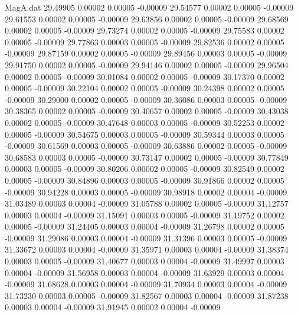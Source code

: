 \begin{filecontents}{MagA.dat}
  29.49905    0.00002    0.00005   -0.00009
  29.54577    0.00002    0.00005   -0.00009
  29.61553    0.00002    0.00005   -0.00009
  29.63856    0.00002    0.00005   -0.00009
  29.68569    0.00002    0.00005   -0.00009
  29.73274    0.00002    0.00005   -0.00009
  29.75583    0.00002    0.00005   -0.00009
  29.77863    0.00003    0.00005   -0.00009
  29.82536    0.00002    0.00005   -0.00009
  29.87159    0.00002    0.00005   -0.00009
  29.89456    0.00003    0.00005   -0.00009
  29.91750    0.00002    0.00005   -0.00009
  29.94146    0.00002    0.00005   -0.00009
  29.96504    0.00002    0.00005   -0.00009
  30.01084    0.00002    0.00005   -0.00009
  30.17370    0.00002    0.00005   -0.00009
  30.22104    0.00002    0.00005   -0.00009
  30.24398    0.00002    0.00005   -0.00009
  30.29000    0.00002    0.00005   -0.00009
  30.36086    0.00003    0.00005   -0.00009
  30.38365    0.00002    0.00005   -0.00009
  30.40657    0.00002    0.00005   -0.00009
  30.43038    0.00002    0.00005   -0.00009
  30.47648    0.00003    0.00005   -0.00009
  30.52253    0.00002    0.00005   -0.00009
  30.54675    0.00003    0.00005   -0.00009
  30.59344    0.00003    0.00005   -0.00009
  30.61569    0.00003    0.00005   -0.00009
  30.63886    0.00002    0.00005   -0.00009
  30.68583    0.00003    0.00005   -0.00009
  30.73147    0.00002    0.00005   -0.00009
  30.77849    0.00003    0.00005   -0.00009
  30.80206    0.00002    0.00005   -0.00009
  30.82549    0.00002    0.00005   -0.00009
  30.84896    0.00003    0.00005   -0.00009
  30.91866    0.00002    0.00005   -0.00009
  30.94228    0.00003    0.00005   -0.00009
  30.98918    0.00002    0.00004   -0.00009
  31.03489    0.00003    0.00004   -0.00009
  31.05788    0.00002    0.00005   -0.00009
  31.12757    0.00003    0.00004   -0.00009
  31.15091    0.00003    0.00005   -0.00009
  31.19752    0.00002    0.00005   -0.00009
  31.24405    0.00003    0.00004   -0.00009
  31.26798    0.00002    0.00005   -0.00009
  31.29086    0.00003    0.00004   -0.00009
  31.31396    0.00003    0.00005   -0.00009
  31.33672    0.00003    0.00004   -0.00009
  31.35971    0.00003    0.00004   -0.00009
  31.38374    0.00003    0.00005   -0.00009
  31.40677    0.00003    0.00004   -0.00009
  31.49997    0.00003    0.00004   -0.00009
  31.56958    0.00003    0.00004   -0.00009
  31.63929    0.00003    0.00004   -0.00009
  31.68628    0.00003    0.00004   -0.00009
  31.70934    0.00003    0.00004   -0.00009
  31.73230    0.00003    0.00005   -0.00009
  31.82567    0.00003    0.00004   -0.00009
  31.87238    0.00003    0.00004   -0.00009
  31.91945    0.00002    0.00004   -0.00009

\end{filecontents}
